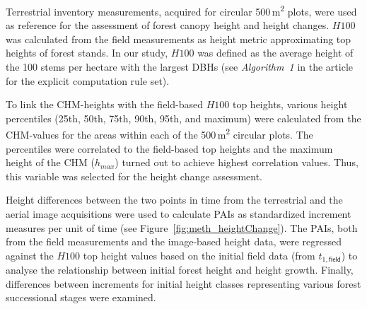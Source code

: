 Terrestrial inventory measurements, acquired for circular 500\,m\textsuperscript{2} plots, 
were used as reference for the assessment of forest canopy height and height changes.
$H100$ was calculated from the field measurements as height metric approximating top heights of forest stands. In our study, $H100$ was 
defined as the average height of the 100 stems per hectare with the largest \acp{DBH} (see \emph{Algorithm~1} in the article for the explicit computation rule set). 

To link the \ac{CHM}-heights with the field-based $H100$ top heights, various height percentiles (25th, 50th, 75th, 90th, 95th, and maximum) were calculated
from the \ac{CHM}-values for the areas within each of the 500\,m\textsuperscript{2} circular plots.
The percentiles were correlated to the field-based top heights and 
the maximum height of the \ac{CHM} ($h_{max}$) turned out to achieve highest correlation values.
Thus, this variable was selected for the height change assessment.

Height differences between the two points in time from the terrestrial and the aerial image acquisitions were used to calculate \acfp{PAI} as 
standardized increment measures per unit of time (see Figure~\ref{fig:meth_heightChange}).
The \acp{PAI}, both from the field measurements and the image-based height data, were regressed against the $H100$ top height values based on the 
initial field data (from $t_{1,\textsf{field}}$) to analyse the relationship between initial forest height and height growth.
Finally, differences between increments for initial height classes representing various forest successional stages were examined.  


